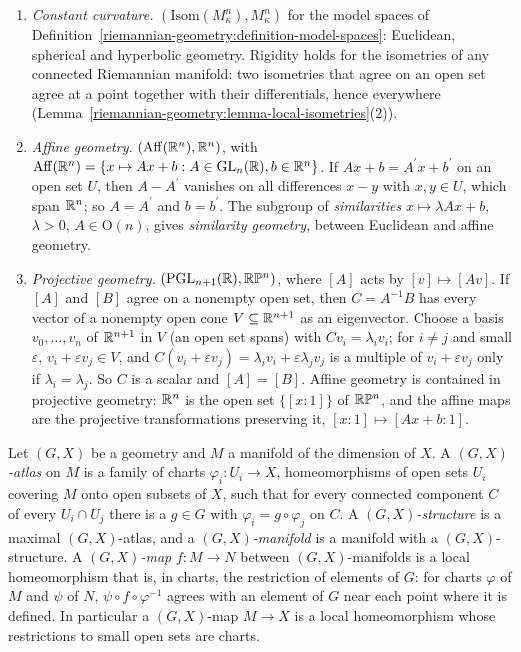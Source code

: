 \begin{example}\label{riemannian-geometry:example-geometries}
\begin{enumerate}
\item \emph{Constant curvature.} $(\mathrm{Isom}(M^n_\kappa), M^n_\kappa)$ for the model spaces of Definition~\ref{riemannian-geometry:definition-model-spaces}: Euclidean, spherical and hyperbolic geometry. Rigidity holds for the
isometries of any connected Riemannian manifold: two isometries that agree on an open set agree at a point together with their differentials, hence everywhere (Lemma~\ref{riemannian-geometry:lemma-local-isometries}(2)).
\item \emph{Affine geometry.} $(\mathrm{Aff}(\mathbb{R}^n), \mathbb{R}^n)$, with $\mathrm{Aff}(\mathbb{R}^n) = \{x \mapsto Ax + b : A \in \mathrm{GL}_n(\mathbb{R}), b \in \mathbb{R}^n\}$. If $Ax + b = A^{\prime}x + b^{\prime}$ on an open set $U$, then $A - A^{\prime}$ vanishes on all differences
$x - y$ with $x, y \in U$, which span $\mathbb{R}^n$; so $A = A^{\prime}$ and $b = b^{\prime}$. The subgroup of \emph{similarities} $x \mapsto \lambda Ax + b$, $\lambda > 0$, $A \in \mathrm{O}(n)$, gives \emph{similarity geometry}, between
Euclidean and affine geometry.
\item \emph{Projective geometry.} $(\mathrm{PGL}_{n+1}(\mathbb{R}), \mathbb{R}\mathbb{P}^n)$, where $[A]$ acts by $[v] \mapsto [Av]$. If $[A]$ and $[B]$ agree on a nonempty open set, then $C = A^{-1}B$ has every vector of a nonempty open cone
$V \subseteq \mathbb{R}^{n+1}$ as an eigenvector. Choose a basis $v_0, \ldots, v_n$ of $\mathbb{R}^{n+1}$ in $V$ (an open set spans) with $Cv_i = \lambda_iv_i$; for $i \neq j$ and small $\varepsilon$, $v_i + \varepsilon v_j \in V$, and
$C(v_i + \varepsilon v_j) = \lambda_iv_i + \varepsilon\lambda_jv_j$ is a multiple of $v_i + \varepsilon v_j$ only if $\lambda_i = \lambda_j$. So $C$ is a scalar and $[A] = [B]$. Affine geometry is contained in projective geometry: $\mathbb{R}^n$ is
the open set $\{[x : 1]\}$ of $\mathbb{R}\mathbb{P}^n$, and the affine maps are the projective transformations preserving it, $[x : 1] \mapsto [Ax + b : 1]$.
\end{enumerate}
\end{example}

\begin{definition}\label{riemannian-geometry:definition-gx-structure}
Let $(G, X)$ be a geometry and $M$ a manifold of the dimension of $X$. A \emph{$(G, X)$-atlas} on $M$ is a family of charts $\varphi_i \colon U_i \to X$, homeomorphisms of open sets $U_i$ covering $M$ onto open subsets
of $X$, such that for every connected component $C$ of every $U_i \cap U_j$ there is a $g \in G$ with $\varphi_i = g \circ \varphi_j$ on $C$. A \emph{$(G, X)$-structure} is a maximal $(G, X)$-atlas, and a
\emph{$(G, X)$-manifold} is a manifold with a $(G, X)$-structure. A \emph{$(G, X)$-map} $f \colon M \to N$ between $(G, X)$-manifolds is a local homeomorphism that is, in charts, the restriction of elements of $G$: for
charts $\varphi$ of $M$ and $\psi$ of $N$, $\psi \circ f \circ \varphi^{-1}$ agrees with an element of $G$ near each point where it is defined. In particular a $(G, X)$-map $M \to X$ is a local homeomorphism whose restrictions
to small open sets are charts.
\end{definition}

